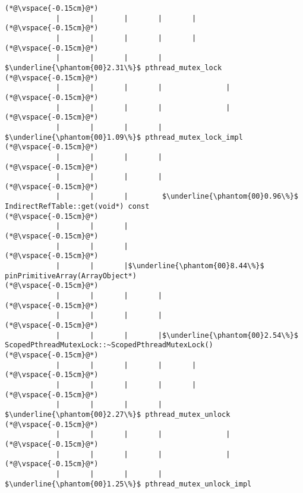 \begin{lstlisting}[caption=Unicode-merkkijonon osoitinoperaatio, label=profile:C2JReadUnicode-512, numberbychapter=true, frame=lines, float, floatplacement=t]
(*@\vspace{-0.15cm}@*)
            |       |       |       |       |
(*@\vspace{-0.15cm}@*)
            |       |       |       |       |
(*@\vspace{-0.15cm}@*)
            |       |       |       |        $\underline{\phantom{00}2.31\%}$ pthread_mutex_lock
(*@\vspace{-0.15cm}@*)
            |       |       |       |               |
(*@\vspace{-0.15cm}@*)
            |       |       |       |               |
(*@\vspace{-0.15cm}@*)
            |       |       |       |                $\underline{\phantom{00}1.09\%}$ pthread_mutex_lock_impl
(*@\vspace{-0.15cm}@*)
            |       |       |       |
(*@\vspace{-0.15cm}@*)
            |       |       |       |
(*@\vspace{-0.15cm}@*)
            |       |       |        $\underline{\phantom{00}0.96\%}$ IndirectRefTable::get(void*) const
(*@\vspace{-0.15cm}@*)
            |       |       |
(*@\vspace{-0.15cm}@*)
            |       |       |
(*@\vspace{-0.15cm}@*)
            |       |       |$\underline{\phantom{00}8.44\%}$ pinPrimitiveArray(ArrayObject*)
(*@\vspace{-0.15cm}@*)
            |       |       |       |
(*@\vspace{-0.15cm}@*)
            |       |       |       |
(*@\vspace{-0.15cm}@*)
            |       |       |       |$\underline{\phantom{00}2.54\%}$ ScopedPthreadMutexLock::~ScopedPthreadMutexLock()
(*@\vspace{-0.15cm}@*)
            |       |       |       |       |
(*@\vspace{-0.15cm}@*)
            |       |       |       |       |
(*@\vspace{-0.15cm}@*)
            |       |       |       |        $\underline{\phantom{00}2.27\%}$ pthread_mutex_unlock
(*@\vspace{-0.15cm}@*)
            |       |       |       |               |
(*@\vspace{-0.15cm}@*)
            |       |       |       |               |
(*@\vspace{-0.15cm}@*)
            |       |       |       |                $\underline{\phantom{00}1.25\%}$ pthread_mutex_unlock_impl

\end{lstlisting}
